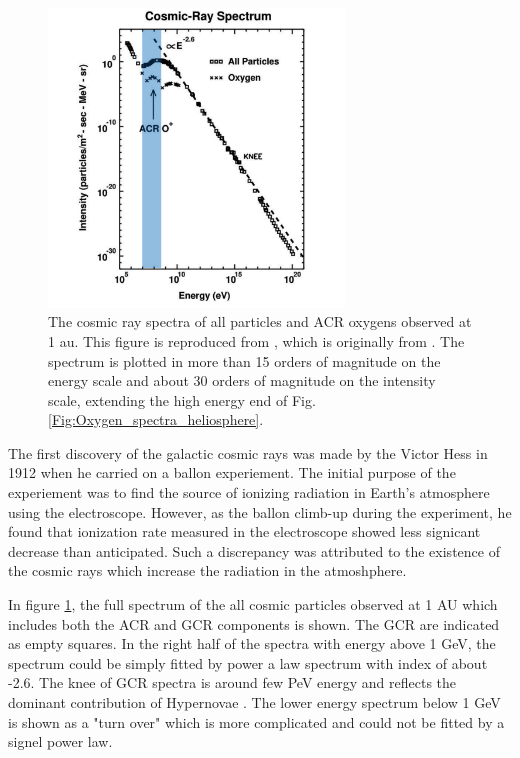 \begin{figure}
	\centering
	\includegraphics[width = 0.7\textwidth]{images/gcr_spectra_shadow.png}
	
	\caption[The cosmic ray spectra of all particles at 1 au]{The cosmic ray spectra of all particles and ACR oxygens observed at 1 au. This figure is reproduced from \citep{Giacalone2022SSRv, Giacalone2012SSRv}, which is originally from \citep{Jokipii1990AIPC}.
	The spectrum is plotted in more than 15 orders of magnitude on the energy scale and about 30 orders of magnitude on the intensity scale, extending the high energy end of Fig.\ref{Fig:Oxygen_spectra_heliosphere}.}
	\label{Fig:Oxygen_spectra_cosmic_ray}
\end{figure}
The first discovery of the galactic cosmic rays was made by the Victor Hess in 1912 when he carried on a ballon experiement. The initial purpose of the experiement was to find the source of ionizing radiation in Earth's atmosphere using the electroscope. However, as the ballon climb-up during the experiment, he found that ionization rate measured in the electroscope showed less signicant decrease than anticipated. Such a discrepancy was attributed to the existence of the cosmic rays which increase the radiation in the atmoshphere.

In figure \ref{Fig:Oxygen_spectra_cosmic_ray}, the full spectrum of the all cosmic particles observed at 1 AU which includes both the \ac{ACR} and \ac{GCR} components is shown. The \acs{GCR} are indicated as empty squares. In the right half of the spectra with energy above 1 GeV, the spectrum could be simply fitted by power a law spectrum with index of about -2.6. The knee of GCR spectra is around few PeV energy and reflects the dominant contribution of Hypernovae \citep{Sveshnikova2003AA,Hoerandel2003APh}. The lower energy spectrum  below 1 GeV is shown as a "turn over" which is more complicated and could not be fitted by a signel power law. 


